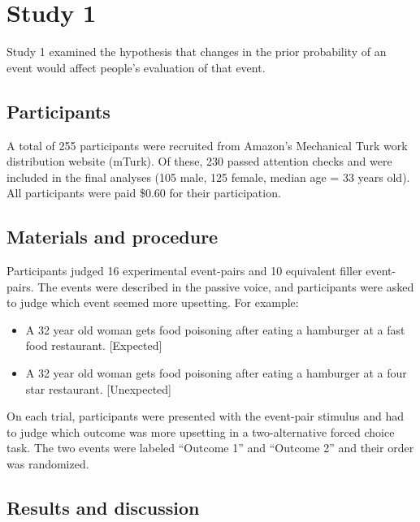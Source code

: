 \documentclass[12pt,]{article}
\begin{document}
\section{Study 1}\label{study-1}

Study 1 examined the hypothesis that changes in the prior probability of
an event would affect people's evaluation of that event.

\subsection{Participants}\label{participants}

A total of 255 participants were recruited from Amazon's Mechanical Turk
work distribution website (mTurk). Of these, 230 passed attention checks
and were included in the final analyses (105 male, 125 female, median
age = 33 years old). All participants were paid \$0.60 for their
participation.

\subsection{Materials and procedure}\label{materials-and-procedure}

Participants judged 16 experimental event-pairs and 10 equivalent filler
event-pairs. The events were described in the passive voice, and
participants were asked to judge which event seemed more upsetting. For
example:

\begin{itemize}
\item
  A 32 year old woman gets food poisoning after eating a hamburger at a
  fast food restaurant. {[}Expected{]}
\item
  A 32 year old woman gets food poisoning after eating a hamburger at a
  four star restaurant. {[}Unexpected{]}
\end{itemize}

On each trial, participants were presented with the event-pair stimulus
and had to judge which outcome was more upsetting in a two-alternative
forced choice task. The two events were labeled ``Outcome 1'' and
``Outcome 2'' and their order was randomized.

\subsection{Results and discussion}\label{results-and-discussion}
\end{document}
